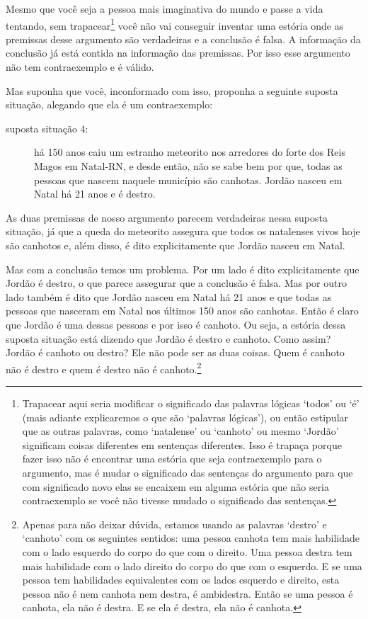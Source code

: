 Mesmo que você seja a pessoa mais imaginativa do mundo e passe a vida tentando, sem trapacear\footnote{
	Trapacear aqui seria modificar o significado das palavras lógicas `todos' ou `é' (mais adiante explicaremos o que são `palavras lógicas'), ou então estipular que as outras palavras, como `natalense' ou `canhoto' ou mesmo `Jordão' significam coisas diferentes em sentenças diferentes.
	Isso é trapaça porque fazer isso não é encontrar uma estória que seja contraexemplo para o argumento, mas é mudar o significado das sentenças do argumento para que com significado novo elas se encaixem em alguma estória que não seria contraexemplo se você não tivesse mudado o significado das sentenças.}
você não vai conseguir inventar uma estória onde as premissas desse argumento são verdadeiras e a conclusão é falsa.
A informação da conclusão já está contida na informação das premissas.
Por isso esse argumento não tem contraexemplo e é válido.

Mas suponha que você, inconformado com isso, proponha a seguinte suposta situação, alegando que ela é um contraexemplo:
\begin{description}
	\item[suposta situação 4:] há 150 anos caiu um estranho meteorito nos arredores do forte dos Reis Magos em Natal-RN, e desde então, não se sabe bem por que, todas as pessoas que nascem naquele município são canhotas. Jordão nasceu em Natal há 21 anos e é destro.
\end{description} 
As duas premissas de nosso argumento parecem verdadeiras nessa suposta situação, já que a queda do meteorito assegura que todos os natalenses vivos hoje são canhotos e, além disso, é dito explicitamente que Jordão nasceu em Natal.

Mas com a conclusão temos um problema.
Por um lado é dito explicitamente que Jordão é destro, o que parece assegurar que a conclusão é falsa.
Mas por outro lado também é dito que Jordão nasceu em Natal há 21 anos e que todas as pessoas que nasceram em Natal nos últimos 150 anos são canhotas.
Então é claro que Jordão é uma dessas pessoas e por isso é canhoto.
Ou seja, a estória dessa suposta situação está dizendo que Jordão é destro e canhoto.
Como assim?
Jordão é canhoto ou destro?
Ele não pode ser as duas coisas.
Quem é canhoto não é destro e quem é destro não é canhoto.\footnote{
	Apenas para não deixar dúvida, estamos usando as palavras `destro' e `canhoto' com os seguintes sentidos: uma pessoa canhota tem mais habilidade com o lado esquerdo do corpo do que com o direito. Uma pessoa destra tem mais habilidade com o lado direito do corpo do que com o esquerdo. E se uma pessoa tem habilidades equivalentes com os lados esquerdo e direito, esta pessoa não é nem canhota nem destra, é ambidestra. Então se uma pessoa é canhota, ela não é destra. E se ela é destra, ela não é canhota.}

